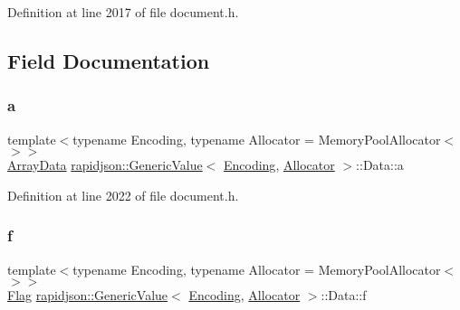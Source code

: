 Definition at line 2017 of file document.\+h.



\subsection{Field Documentation}
\mbox{\label{unionrapidjson_1_1_generic_value_1_1_data_a38d33576b9ff6ad4e50046999dcfd9ad}} 
\subsubsection{\texorpdfstring{a}{a}}
{\footnotesize\ttfamily template$<$typename Encoding, typename Allocator = Memory\+Pool\+Allocator$<$$>$$>$ \\
\mbox{\hyperlink{structrapidjson_1_1_generic_value_1_1_array_data}{Array\+Data}} \mbox{\hyperlink{classrapidjson_1_1_generic_value}{rapidjson\+::\+Generic\+Value}}$<$ \mbox{\hyperlink{classrapidjson_1_1_encoding}{Encoding}}, \mbox{\hyperlink{classrapidjson_1_1_allocator}{Allocator}} $>$\+::Data\+::a}



Definition at line 2022 of file document.\+h.

\mbox{\label{unionrapidjson_1_1_generic_value_1_1_data_a316504c65a492283fd6d87b017f58e29}} 
\subsubsection{\texorpdfstring{f}{f}}
{\footnotesize\ttfamily template$<$typename Encoding, typename Allocator = Memory\+Pool\+Allocator$<$$>$$>$ \\
\mbox{\hyperlink{structrapidjson_1_1_generic_value_1_1_flag}{Flag}} \mbox{\hyperlink{classrapidjson_1_1_generic_value}{rapidjson\+::\+Generic\+Value}}$<$ \mbox{\hyperlink{classrapidjson_1_1_encoding}{Encoding}}, \mbox{\hyperlink{classrapidjson_1_1_allocator}{Allocator}} $>$\+::Data\+::f}



